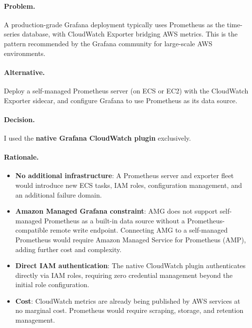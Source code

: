\paragraph{Problem.}
A production-grade Grafana deployment typically uses Prometheus as the
time-series database, with CloudWatch Exporter bridging AWS metrics.
This is the pattern recommended by the Grafana community for large-scale
AWS environments.

\paragraph{Alternative.}
Deploy a self-managed Prometheus server (on ECS or EC2) with the
CloudWatch Exporter sidecar, and configure Grafana to use Prometheus
as its data source.

\paragraph{Decision.} I used the \textbf{native Grafana CloudWatch plugin}
exclusively.

\paragraph{Rationale.}

\begin{itemize}
    \item \textbf{No additional infrastructure}: A Prometheus server
          and exporter fleet would introduce new ECS tasks, IAM roles,
          configuration management, and an additional failure domain.

    \item \textbf{Amazon Managed Grafana constraint}: AMG does not
          support self-managed Prometheus as a built-in data source
          without a Prometheus-compatible remote write endpoint.
          Connecting AMG to a self-managed Prometheus would require
          Amazon Managed Service for Prometheus (AMP), adding further
          cost and complexity.

    \item \textbf{Direct IAM authentication}: The native CloudWatch
          plugin authenticates directly via IAM roles, requiring zero
          credential management beyond the initial role configuration.

    \item \textbf{Cost}: CloudWatch metrics are already being published
          by AWS services at no marginal cost. Prometheus would require
          scraping, storage, and retention management.
\end{itemize}

